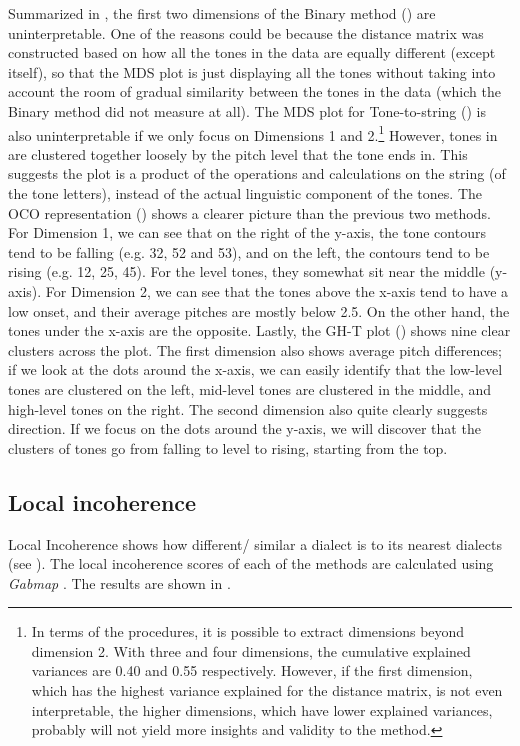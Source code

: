 \documentclass[output=paper, chinesefont]{langscibook}
\begin{document}
Summarized in , the first two dimensions of the Binary method () are uninterpretable. One of the reasons could be because the distance matrix was constructed based on how all the tones in the data are equally different (except itself), so that the MDS plot is just displaying all the tones without taking into account the room of gradual similarity between the tones in the data (which the Binary method did not measure at all). The MDS plot for Tone-to-string () is also uninterpretable if we only focus on Dimensions 1 and 2.\footnote{In terms of the procedures, it is possible to extract dimensions beyond dimension 2. With three and four dimensions, the cumulative explained variances are 0.40 and 0.55 respectively. However, if the first dimension, which has the highest variance explained for the distance matrix, is not even interpretable, the higher dimensions, which have lower explained variances, probably will not yield more insights and validity to the method.} However, tones in  are clustered together loosely by the pitch level that the tone ends in. This suggests the plot is a product of the operations and calculations on the string (of the tone letters), instead of the actual linguistic component of the tones. The OCO representation () shows a clearer picture than the previous two methods. For Dimension 1, we can see that on the right of the y-axis, the tone contours tend to be falling (e.g. 32, 52 and 53), and on the left, the contours tend to be rising (e.g. 12, 25, 45). For the level tones, they somewhat sit near the middle (y-axis). For Dimension 2, we can see that the tones above the x-axis tend to have a low onset, and their average pitches are mostly below 2.5. On the other hand, the tones under the x-axis are the opposite. Lastly, the GH-T plot () shows nine clear clusters across the plot. The first dimension also shows average pitch differences; if we look at the dots around the x-axis, we can easily identify that the low-level tones are clustered on the left, mid-level tones are clustered in the middle, and high-level tones on the right. The second dimension also quite clearly suggests direction. If we focus on the dots around the y-axis, we will discover that the clusters of tones go from falling to level to rising, starting from the top.

\subsection{Local incoherence}
\label{sec:sung:5.2}
Local Incoherence shows how different/ similar a dialect is to its nearest dialects (see ). The local incoherence scores of each of the methods are calculated using \textit{Gabmap} \citep{Nerbonne2011, Leinonen2016}. The results are shown in .
\end{document}

